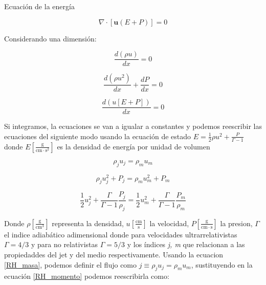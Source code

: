 \documentclass[12pt,a4paper]{book}
\begin{document}
Ecuación de la energía

\begin{equation}
 \nabla \cdot \left[ \mathbf{u} \left( E+P \right) \right] = 0
\end{equation}

Considerando una dimensión:

\begin{equation}
\dfrac{d \left( \rho u \right)}{d x} = 0
\end{equation}

\begin{equation}
\dfrac{d \left( \rho u^2 \right)}{d x}+ \dfrac{d P}{d x}=0
\end{equation}

\begin{equation}
\dfrac{d \left( u\left[E+P \right] \right)}{d x} = 0
\end{equation}

Si integramos, la ecuaciones se van a igualar a constantes y podemos reescribir las ecuaciones del siguiente modo usando la ecuación de estado $E = \frac{1}{2} \rho u^2 + \frac{P}{\Gamma-1}$ donde $E \left[\frac{\mathrm{g}}{\mathrm{cm} \cdot \mathrm{s}^2}\right]$ es la densidad de energía por unidad de volumen

\begin{equation}\label{RH_masa}
\rho_j u_j = \rho_m u_m
\end{equation}

\begin{equation}\label{RH_momento}
\rho_j u_{j}^{2}+P_j = \rho_m u_{m}^{2}+P_m
\end{equation}

\begin{equation}\label{RH_Energia}
\frac{1}{2} u_{j}^{2}+ \frac{\Gamma}{\Gamma-1} \frac{P_{j}}{\rho_{j}} =
 \frac{1}{2} u_{m}^{2}+ \frac{\Gamma}{\Gamma-1} \frac{P_{m}}{\rho_{m}}
\end{equation}

Donde $\rho \left[\frac{\mathrm{g}}{\mathrm{cm}^3}\right]$ representa la densidad, $u \left[\frac{\mathrm{cm}}{\mathrm{s} }\right]$ la velocidad, $P \left[\frac{\mathrm{g}}{\mathrm{cm} \cdot \mathrm{s}}\right]$ la presion, $\Gamma$ el indice adiabático adimensional donde para velocidades ultrarrelativistas $\Gamma = 4/3$ y para no relativistas $\Gamma = 5/3$ y los índices \textit{j, m} que  relacionan a las propiedaddes del jet y del medio respectivamente. Usando la ecuacion \ref{RH_masa}, podemos definir el flujo como $j \equiv \rho_j u_j = \rho_m u_m$, sustituyendo en la ecuación \ref{RH_momento} podemos reescribirla como:
\end{document}
